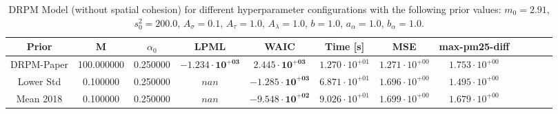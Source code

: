 \begin{table}
\caption{DRPM Model (without spatial cohesion) for different hyperparameter configurations with the following prior values: $m_0 = 2.91$, $s_0^2 = 200.0$, $A_\sigma = 0.1$, $A_\tau = 1.0$, $A_\lambda = 1.0$, $b = 1.0$, $a_\alpha = 1.0$, $b_\alpha = 1.0$.}
\centering\begin{tabular}{cccccccccccc}
\toprule
Prior & M & $\alpha_0$ & LPML & WAIC & Time [s] & MSE & max-pm25-diff \\
\midrule
DRPM-Paper & 100.000000 & 0.250000 & $\mathbf{-1.234 \cdot 10^{+03}}$ & $\mathbf{2.445 \cdot 10^{+03}}$ & $1.270 \cdot 10^{+01}$ & $1.271 \cdot 10^{+00}$ & $1.753 \cdot 10^{+00}$ \\
Lower Std & 0.100000 & 0.250000 & $nan$ & $\mathbf{-1.285 \cdot 10^{+03}}$ & $6.871 \cdot 10^{+01}$ & $1.696 \cdot 10^{+00}$ & $1.495 \cdot 10^{+00}$ \\
Mean 2018 & 0.100000 & 0.250000 & $nan$ & $\mathbf{-9.548 \cdot 10^{+02}}$ & $9.026 \cdot 10^{+01}$ & $1.699 \cdot 10^{+00}$ & $1.679 \cdot 10^{+00}$ \\
\bottomrule
\end{tabular}
\end{table}